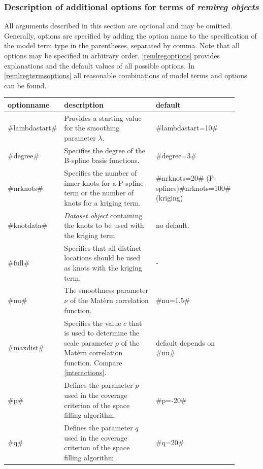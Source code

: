 \subsubsection{Description of additional options for terms of {\em remlreg objects}}
\label{remlreglocaloptions}

All arguments described in this section are optional and may be
omitted. Generally, options are specified by adding the option
name to the specification of the model term type in the
parentheses, separated by comma. Note that all options may be
specified in arbitrary order. \autoref{remlregoptions} provides
explanations and the default values of all possible options. In
\autoref{remlregtermsoptions} all reasonable combinations of model
terms and options can be found.

\begin{table}[ht] \footnotesize \centering
\begin{tabular}{|p{0.1\linewidth}|p{0.6\linewidth}|p{0.2\linewidth}|}
 \hline
 optionname & description & default\\
 \hline\hline
 #lambdastart# & Provides a starting value for the smoothing parameter $\lambda$. & #lambdastart=10# \\
 \hline
 #degree# & Specifies the degree of the B-spline basis functions. & #degree=3# \\
 \hline
 #nrknots# & Specifies the number of inner knots for a P-spline term or the number of knots for a kriging term. & #nrknots=20# (P-splines)\newline #nrknots=100# (kriging)  \\
 \hline
 #knotdata# & {\em Dataset object} containing the knots to be used
 with the kriging term & no default.\\
 \hline
 #full# & Specifies that all distinct locations should be used as
 knots with the kriging term. & -\\
 \hline
 #nu# & The smoothness parameter $\nu$ of the Mat\`{e}rn correlation function. & #nu=1.5# \\
 \hline
 #maxdist# & Specifies the value $c$ that is used to determine the scale parameter $\rho$ of the Mat\`{e}rn correlation function. Compare \autoref{interactions}. & default depends on #nu#\\
 \hline
 #p# & Defines the parameter $p$ used in the coverage criterion of the space filling algorithm. & #p=-20#\\
 \hline
 #q# & Defines the parameter $q$ used in the coverage criterion of the space filling algorithm. & #q=20#\\

\end{tabular}
\end{table}
